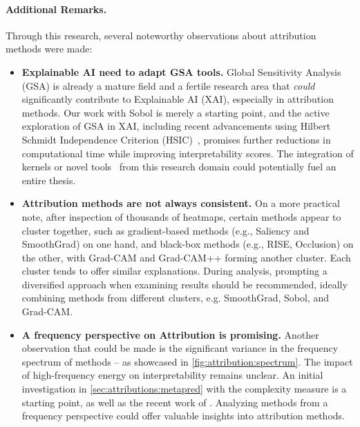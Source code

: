 \paragraph{Additional Remarks.} Through this research, several noteworthy observations about attribution methods were made:

\begin{itemize}
    \item \textbf{Explainable AI need to adapt GSA tools.} Global Sensitivity Analysis (GSA) is already a mature field and a fertile research area that \textit{could} significantly contribute to Explainable AI (XAI), especially in attribution methods. Our work with Sobol is merely a starting point, and the active exploration of GSA in XAI, including recent advancements using Hilbert Schmidt Independence Criterion (HSIC)~\cite{novello2022making}, promises further reductions in computational time while improving interpretability scores. The integration of kernels or novel tools~\cite{da2015global,sarazin2023new} from this research domain could potentially fuel an entire thesis. 

    \item \textbf{Attribution methods are not always consistent.} On a more practical note, after inspection of thousands of heatmaps, certain methods appear to cluster together, such as gradient-based methods (e.g., Saliency and SmoothGrad) on one hand, and black-box methods (e.g., RISE, Occlusion) on the other, with Grad-CAM and Grad-CAM++ forming another cluster. Each cluster tends to offer similar explanations. During analysis, prompting a diversified approach when examining results should be recommended, ideally combining methods from different clusters, e.g. SmoothGrad, Sobol, and Grad-CAM.

    \item \textbf{A frequency perspective on Attribution is promising.} Another observation that could be made is the significant variance in the frequency spectrum of methods -- as showcased in \autoref{fig:attribution:spectrum}. The impact of high-frequency energy on interpretability remains unclear. An initial investigation in \autoref{sec:attributions:metapred} with the complexity measure is a starting point, as well as the recent work of \cite{muzellec2023gradient}. Analyzing methods from a frequency perspective could offer valuable insights into attribution methods.

\end{itemize}

